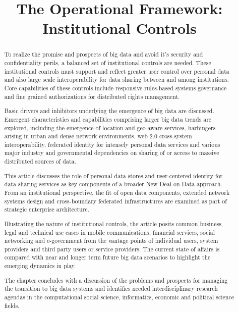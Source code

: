 \documentclass{sigchi}
\begin{document}
\title{The Operational Framework: Institutional Controls}



\maketitle

\begin{abstract}
To realize the promise and prospects of big data and avoid it’s security and confidentiality perils, a balanced set of institutional controls are needed.  These institutional controls must support and reflect greater user control over personal data and also large scale interoperability for data sharing between and among institutions.  Core capabilities of these controls include responsive rules-based systems governance and fine grained authorizations for distributed rights management. 

Basic drivers and inhibitors underlying the emergence of big data are discussed.  Emergent characteristics and capabilities comprising larger big data trends are explored, including the emergence of location and geo-aware services, harbingers arising in urban and dense network environments, web 2.0 cross-system interoperability, federated identity for intensely personal data services and various major industry and governmental dependencies on sharing of or access to massive distributed sources of data.  

This article discusses the role of personal data stores and user-centered identity for data sharing services as key components of a broader New Deal on Data approach.   From an institutional perspective, the fit of open data components, extended network systems design and cross-boundary federated infrastructures are examined as part of strategic enterprise architecture. 

Illustrating the nature of institutional controls, the article posits common business, legal and technical use cases in mobile communications, financial services, social networking and e-government from the vantage points of individual users, system providers and third party users or service providers.  The current state of affairs is compared with near and longer term future big data scenarios to highlight the emerging dynamics in play.  

The chapter concludes with a discussion of the problems and prospects for managing the transition to big data systems and identifies needed interdisciplinary research agendas in the computational social science, informatics, economic and political science fields.  
\end{abstract}
\end{document}
